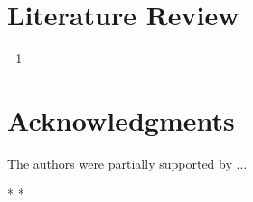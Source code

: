 \documentclass[12pt,letterpaper]{article}
\begin{document}
\section*{Literature Review}\label{sec:lit_review}
\looseness - 1
\section*{Acknowledgments}
The authors were partially supported by ...




*
*


\end{document}
